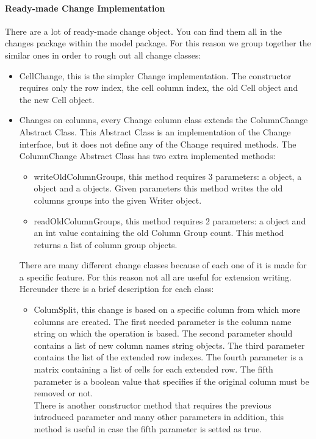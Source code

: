 \paragraph{Ready-made Change Implementation} There are a lot of ready-made change object. You can find them all in the changes package within the model package. For this reason we group together the similar ones in order to rough out all change classes:
\begin{itemize}
	\item \textsf{CellChange}, this is the simpler Change implementation. The constructor requires only the row index, the cell column index, the old Cell object and the new Cell object.
	\item \textsf{Changes on columns}, every Change column class extends the ColumnChange Abstract Class. This Abstract Class is an implementation of the Change interface, but it does not define any of the Change required methods. The ColumnChange Abstract Class has two extra implemented methods:
	\begin{itemize}
		\item \textsf{writeOldColumnGroups}, this method requires 3 parameters: a  object, a  object and a  objects. Given parameters this method writes the old columns groups into the given Writer object.
		\item \textsf{readOldColumnGroups}, this method requires 2 parameters: a  object and an int value containing the old Column Group count. This method returns a list of column group objects.
	\end{itemize}
	There are many different change classes because of each one of it is made for a specific feature. For this reason not all are useful for extension writing. Hereunder there is a brief description for each class:
	\begin{itemize}
		\item ColumSplit, this change is based on a specific column from which more columns are created. The first needed parameter is the column name string on which the operation is based. The second parameter should contains a list of new column names string objects. The third parameter contains the list of the extended row indexes. The fourth parameter is a matrix containing a list of cells for each extended row. The fifth parameter is a boolean value that specifies if the original column must be removed or not.\\
		There is another constructor method that requires the previous introduced parameter and many other parameters in addition, this method is useful in case the fifth parameter is setted as true.

\end{itemize}
\end{itemize}
